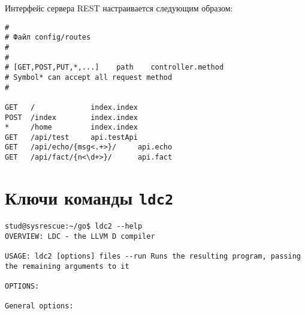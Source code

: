 \documentclass{studrep}
\begin{document}
Интерфейс сервера REST настраивается следующим образом:
\begin{verbatim}
#
# Файл config/routes
#
#
# [GET,POST,PUT,*,...]    path    controller.method
# Symbol* can accept all request method
#

GET   /             index.index
POST  /index        index.index
*     /home         index.index
GET   /api/test     api.testApi
GET   /api/echo/{msg<.+>}/     api.echo
GET   /api/fact/{n<\d+>}/      api.fact
\end{verbatim}


\chapter{Ключи команды \texttt{ldc2}}\label{chap:cmds}
\begin{verbatim}
stud@sysrescue:~/go$ ldc2 --help
OVERVIEW: LDC - the LLVM D compiler

USAGE: ldc2 [options] files --run Runs the resulting program, passing the remaining arguments to it

OPTIONS:

General options:


\end{verbatim}
\end{document}
